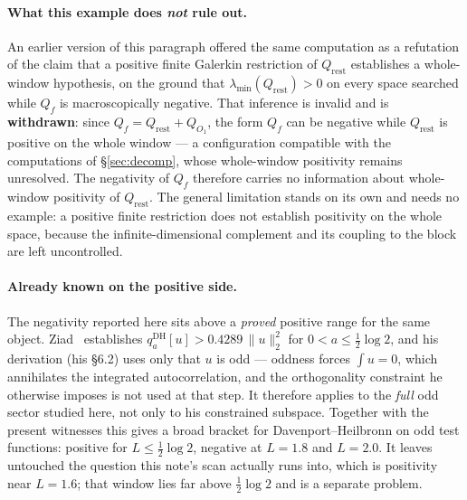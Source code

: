 \documentclass[11pt,a4paper]{article}
\theoremstyle{definition}
\theoremstyle{remark}
\newcommand{\lmin}{\lambda_{\min}}
\newcommand{\Qrest}{Q_{\mathrm{rest}}}
\begin{document}
\paragraph{What this example does \emph{not} rule out.} An earlier version of this
paragraph offered the same computation as a refutation of the claim that a positive finite
Galerkin restriction of $\Qrest$ establishes a whole-window hypothesis, on the ground that
$\lmin(\Qrest)>0$ on every space searched while $Q_f$ is macroscopically negative. That
inference is invalid and is \textbf{withdrawn}: since $Q_f = \Qrest + Q_{O_1}$, the form
$Q_f$ can be negative while $\Qrest$ is positive on the whole window --- a configuration
compatible with the computations of \S\ref{sec:decomp}, whose whole-window positivity
remains unresolved. The negativity of $Q_f$ therefore carries
no information about whole-window positivity of $\Qrest$. The general limitation stands
on its own and needs no example: a positive finite restriction does not establish
positivity on the whole space, because the infinite-dimensional complement and its
coupling to the block are left uncontrolled.

\paragraph{Already known on the positive side.} The negativity reported here sits above a
\emph{proved} positive range for the same object. Ziad~\cite{Ziad} establishes
$q^{\mathrm{DH}}_a[u] > 0.4289\,\|u\|_2^2$ for $0 < a \le \tfrac12\log 2$, and his
derivation (his \S6.2) uses only that $u$ is odd --- oddness forces $\int u = 0$, which
annihilates the integrated autocorrelation, and the orthogonality constraint he otherwise
imposes is not used at that step. It therefore applies to the \emph{full} odd sector
studied here, not only to his constrained subspace. Together with the present witnesses
this gives a broad bracket for Davenport--Heilbronn on odd test functions: positive for
$L \le \tfrac12\log 2$, negative at $L = 1.8$ and $L = 2.0$. It leaves untouched the
question this note's scan actually runs into, which is positivity near $L = 1.6$; that
window lies far above $\tfrac12\log 2$ and is a separate problem.
\end{document}
